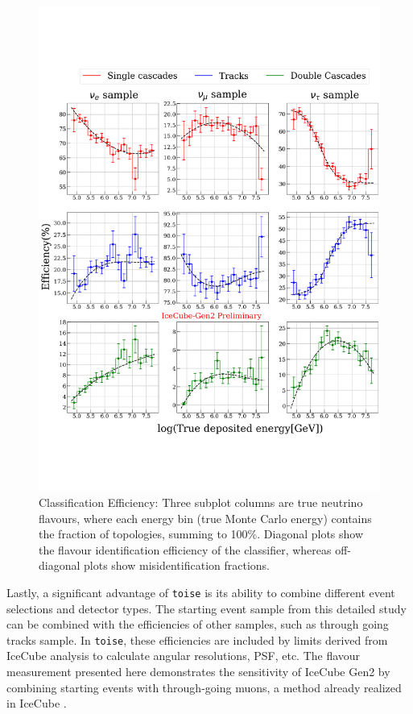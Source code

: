 \begin{figure}[h!]

    \centering
    \includegraphics{./figures/gen2/ClassificationEff_small_watermark.pdf}
    \caption[Classification efficiency of a ternary particle identifier for IceCube-Gen2]{Classification Efficiency: Three subplot columns are true neutrino flavours, where each energy bin (true Monte Carlo energy) contains the fraction of topologies, summing to 100\%. Diagonal plots show the flavour identification efficiency of the classifier, whereas off-diagonal plots show misidentification fractions.
    }
\end{figure}

Lastly, a significant advantage of \texttt{toise} is its ability to combine different event selections and detector types. The starting event sample from this detailed study can be combined with the efficiencies of other samples, such as through going tracks sample. In \texttt{toise}, these efficiencies are included by limits derived from IceCube analysis  to calculate angular resolutions, PSF, etc. The flavour measurement presented here demonstrates the sensitivity of IceCube Gen2 by combining starting events with through-going muons, a method already realized in IceCube .

